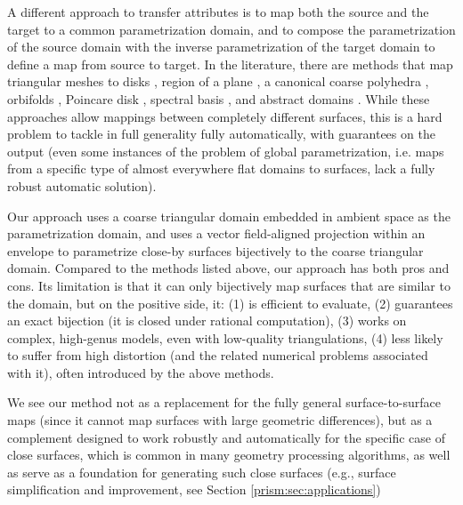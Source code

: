 A different approach to transfer attributes is to map both the source and the target to a common parametrization domain, and to compose the parametrization of the source domain with the inverse parametrization of the target domain to define a map from source to target. In the literature, there are methods that map triangular meshes to disks \cite{Tutte:1963,Floater:97}, region of a plane 
\cite{maron2017convolutional,Aigerman:2015b,Aigerman:2014,Schuller:2013,Smith:2015,rabinovich2017scalable,jiang2017simplicial,Weber:2014:LIP,Campen:2016,Muller:2015,Gotsman:2001,surazhsky2001morphing,Zhang:2005,Fu:2016,litke2005image,schmidt2019distortion}, a canonical coarse polyhedra \cite{kraevoy2004cross,praun2001consistent}, orbifolds \cite{Aigerman:2015,Aigerman:2017,Aigerman:2016}, Poincare disk \cite{Springborn:2008,stephenson2005introduction,Kharevych:2006,Jin:2008}, spectral basis \cite{Ovsjanikov:2012,Shoham:2019,Ovsjanikov:2017}, and abstract domains \cite{kraevoy2004cross,Schreiner:2004,Pietroni:2010}.
While these approaches allow mappings between completely different surfaces, this is a hard problem to tackle in full generality fully automatically, with guarantees on the output (even some instances of the problem of global parametrization, i.e. maps from a specific type of almost everywhere flat domains to surfaces, lack a fully robust automatic solution).

%
Our approach uses a coarse triangular domain embedded in ambient space as the parametrization domain, and uses a vector field-aligned projection within an envelope to parametrize close-by surfaces bijectively to the coarse triangular domain. Compared to the methods listed above, our approach has both pros and cons. Its limitation is that it can only bijectively map surfaces that are similar to the domain, but on the positive side, it: (1) is efficient to evaluate, (2)  guarantees an exact bijection (it is closed under rational computation), (3)  works on complex, high-genus models, even with low-quality triangulations, (4) less likely to suffer from high distortion (and the related numerical problems associated with it), often introduced by the above methods.

 We see our method not as a replacement for the fully general surface-to-surface maps (since it cannot map surfaces with large geometric differences), but as a complement designed to work robustly and automatically for the specific case of close surfaces, which is common in many geometry processing algorithms, as well as serve as a foundation for generating such close surfaces (e.g., surface simplification and improvement, see Section \ref{prism:sec:applications})

